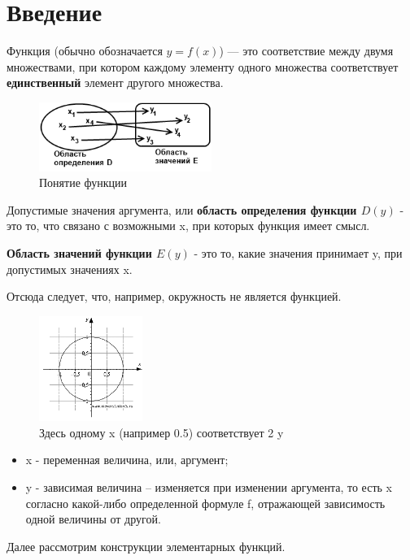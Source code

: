 \section{Введение}

Функция (обычно обозначается $y = f(x)$) — это соответствие между двумя множествами, при котором каждому элементу одного множества соответствует \textbf{единственный} элемент другого множества.

\begin{figure}[h]
	\centering
	\includegraphics[width=0.5\textwidth]{img/ponyatie-funkcii.png}
	\caption{Понятие функции}
\end{figure}
Допустимые значения аргумента, или \textbf{область определения функции $D(y)$} - это то, что связано с возможными x, при которых функция имеет смысл.

\textbf{Область значений функции $E(y)$} - это то, какие значения принимает y, при допустимых значениях x.

Отсюда следует, что, например, окружность не является функцией.

\begin{figure}[h]
	\centering
	\includegraphics[width=0.3\textwidth]{img/unnamed.png}
	\caption{Здесь одному x (например 0.5) соответствует 2 y}
\end{figure}

\begin{itemize}
    \item x - переменная величина, или, аргумент;
    \item y - зависимая величина – изменяется при изменении аргумента, то есть x согласно какой-либо определенной формуле f, отражающей зависимость одной величины от другой.
\end{itemize}

Далее рассмотрим конструкции элементарных функций.